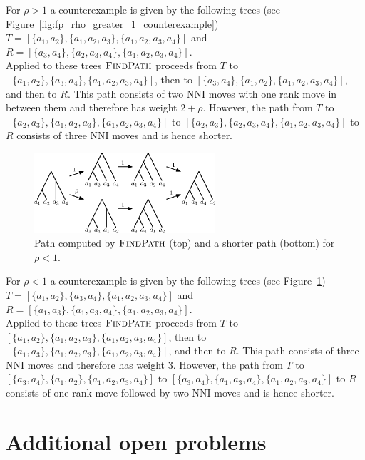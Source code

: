 \documentclass[11pt]{amsart}
\newcommand{\findpath}{\textsc{FindPath}}
\newcommand{\nni}{\mathrm{NNI}}
\begin{document}
For $\rho > 1$ a counterexample is given by the following trees (see Figure~\ref{fig:fp_rho_greater_1_counterexample})\\
$T = [\{a_1,a_2\},\{a_1,a_2,a_3\},\{a_1,a_2,a_3,a_4\}]$ and $R = [\{a_3,a_4\},\{a_2,a_3,a_4\},\{a_1,a_2,a_3,a_4\}]$.\\
Applied to these trees $\findpath$ proceeds from $T$ to $[\{a_1,a_2\},\{a_3,a_4\},\{a_1,a_2,a_3,a_4\}]$, then to $[\{a_3,a_4\},\{a_1,a_2\},\{a_1,a_2,a_3,a_4\}]$, and then to $R$.
This path consists of two $\nni$ moves with one rank move in between them and therefore has weight $2 + \rho$.
However, the path from $T$ to $[\{a_2,a_3\},\{a_1,a_2,a_3\},\{a_1,a_2,a_3,a_4\}]$ to $[\{a_2,a_3\},\{a_2,a_3,a_4\},\{a_1,a_2,a_3,a_4\}]$ to $R$ consists of three $\nni$ moves and is hence shorter.

\begin{figure}[ht]
\centering
\includegraphics[width=0.6\textwidth]{fp_rho_less_1_counterexample}
\caption{Path computed by $\findpath$ (top) and a shorter path (bottom) for $\rho < 1$.}
\label{fig:fp_rho_less_1_counterexample}
\end{figure}

For $\rho < 1$ a counterexample is given by the following trees (see Figure~\ref{fig:fp_rho_less_1_counterexample})\\
$T = [\{a_1,a_2\},\{a_3,a_4\},\{a_1,a_2,a_3,a_4\}]$ and $R = [\{a_1,a_3\},\{a_1,a_3,a_4\},\{a_1,a_2,a_3,a_4\}]$.\\
Applied to these trees $\findpath$ proceeds from $T$ to $[\{a_1,a_2\},\{a_1,a_2,a_3\},\{a_1,a_2,a_3,a_4\}]$, then to $[\{a_1,a_3\},\{a_1,a_2,a_3\},\{a_1,a_2,a_3,a_4\}]$, and then to $R$.
This path consists of three $\nni$ moves and therefore has weight $3$.
However, the path from $T$ to $[\{a_3, a_4\},\{a_1, a_2\},\{a_1, a_2, a_3, a_4\}]$ to $[\{a_3,a_4\},\{a_1, a_3, a_4\},\{a_1, a_2, a_3, a_4\}]$ to $R$ consists of one rank move followed by two $\nni$ moves and is hence shorter.
\endproof


\section{Additional open problems}
\end{document}
